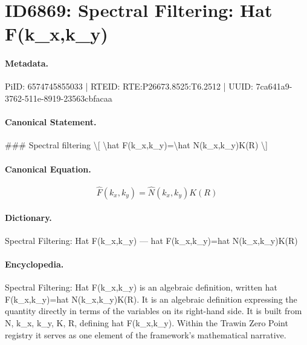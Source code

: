 \section*{ID6869: Spectral Filtering: Hat F(k\_x,k\_y)}
\paragraph{Metadata.}
PiID: 6574745855033 | RTEID: RTE:P26673.8525:T6.2512 | UUID: 7ca641a9-3762-511e-8919-23563cbfacaa

\paragraph{Canonical Statement.}
\#\#\# Spectral filtering \textbackslash{}[ \textbackslash{}hat F(k\_x,k\_y)=\textbackslash{}hat N(k\_x,k\_y)K(R) \textbackslash{}]

\paragraph{Canonical Equation.}
\[
\hat F(k_x,k_y)=\hat N(k_x,k_y)K(R)
\]

\paragraph{Dictionary.}
Spectral Filtering: Hat F(k\_x,k\_y) — hat F(k\_x,k\_y)=hat N(k\_x,k\_y)K(R)

\paragraph{Encyclopedia.}
Spectral Filtering: Hat F(k\_x,k\_y) is an algebraic definition, written hat F(k\_x,k\_y)=hat N(k\_x,k\_y)K(R). It is an algebraic definition expressing the quantity directly in terms of the variables on its right-hand side. It is built from N, k\_x, k\_y, K, R, defining hat F(k\_x,k\_y). Within the Trawin Zero Point registry it serves as one element of the framework's mathematical narrative.
